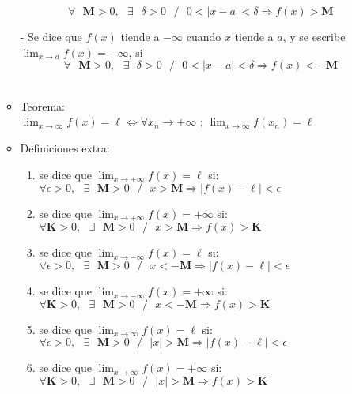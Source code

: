 \documentclass[a4paper,11pt]{report}
\begin{document}
\begin{itemize}
\begin{itemize}
$$\forall\text{ } \mathbf{M} > 0,\text{ }\exists\text{ } \delta > 0\text{ } /\text{ } 0 < |x-a|<\delta \Longrightarrow f(x) > \mathbf{M}$$
\item[-] Se dice que $f(x)$ tiende a $-\infty$ cuando $x$ tiende a $a$, y se escribe $\displaystyle \lim_{x\to a} f(x) = -\infty$, si
$$\forall\text{ } \mathbf{M} > 0,\text{ }\exists\text{ } \delta > 0\text{ } /\text{ } 0 < |x-a|<\delta \Longrightarrow f(x) < -\mathbf{M}$$\\
\item Teorema: \\
$\displaystyle \lim_{x\to \infty} f(x) = \ell \Longleftrightarrow \forall x_n \to +\infty$ ; $\displaystyle \lim_{x\to \infty} f(x_n) = \ell$ \\
\item Definiciones extra:
\begin{enumerate}
\item se dice que $\displaystyle \lim_{x\to +\infty} f(x) = \ell$ si: \\[5pt]
$\forall \epsilon > 0,\text{ }\exists \text{ }\mathbf{M} > 0\text{ } /\text{ } x> \mathbf{M} \Longrightarrow |f(x) - \ell| < \epsilon$
\item se dice que $\displaystyle \lim_{x\to +\infty} f(x) = +\infty$ si:  \\[5pt]
$\forall \mathbf{K} > 0,\text{ }\exists \text{ }\mathbf{M} > 0\text{ } /\text{ } x> \mathbf{M} \Longrightarrow f(x) > \mathbf{K}$
\item se dice que $\displaystyle \lim_{x\to -\infty} f(x) = \ell$ si: \\[5pt]
$\forall \epsilon > 0,\text{ }\exists \text{ }\mathbf{M} > 0\text{ } /\text{ } x < -\mathbf{M} \Longrightarrow |f(x) - \ell| < \epsilon$
\item se dice que $\displaystyle \lim_{x\to -\infty} f(x) = +\infty$ si: \\[5pt]
$\forall \mathbf{K} > 0,\text{ }\exists \text{ }\mathbf{M} > 0\text{ } /\text{ } x < -\mathbf{M} \Longrightarrow f(x) > \mathbf{K}$
\item se dice que $\displaystyle \lim_{x\to \infty} f(x) = \ell$ si:  \\[5pt]
$\forall \epsilon > 0,\text{ }\exists \text{ }\mathbf{M} > 0\text{ } /\text{ }|x|> \mathbf{M} \Longrightarrow |f(x) - \ell| < \epsilon$
\item se dice que $\displaystyle \lim_{x\to \infty} f(x) = +\infty$ si:  \\[5pt]
$\forall \mathbf{K} > 0,\text{ }\exists \text{ }\mathbf{M} > 0\text{ } /\text{ } |x| > \mathbf{M} \Longrightarrow f(x) >\mathbf{K}$

\end{enumerate}
\end{itemize}
\end{itemize}
\end{document}
